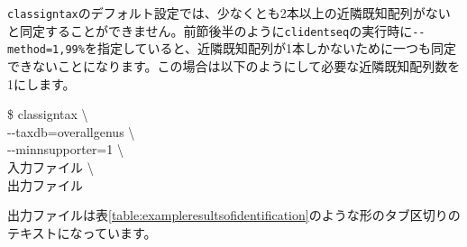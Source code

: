 \documentclass[titlepage,10pt,a4paper,english]{jsbook}
\newenvironment{cmd}{\begin{oframed}\raggedright\ttfamily\footnotesize\setlength{\baselineskip}{1.4em}}{\end{oframed}\vspace{-1em}}
\begin{document}
\texttt{classigntax}のデフォルト設定では、少なくとも2本以上の近隣既知配列がないと同定することができません。前節後半のように\texttt{clidentseq}の実行時に\texttt{{-}{-}method=1,99\%}を指定していると、近隣既知配列が1本しかないために一つも同定できないことになります。この場合は以下のようにして必要な近隣既知配列数を1にします。
\begin{cmd}
\$ classigntax {\textbackslash}\\
{-}{-}taxdb=overall{\textunderscore}genus {\textbackslash}\\
{-}{-}minnsupporter=1 {\textbackslash}\\
入力ファイル {\textbackslash}\\
出力ファイル
\end{cmd}
出力ファイルは表\ref{table:exampleresultsofidentification}のような形のタブ区切りのテキストになっています。
\end{document}
